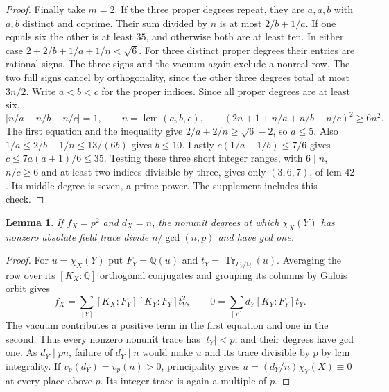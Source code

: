 \documentclass[11pt]{amsart}
\numberwithin{equation}{section}
\newtheorem{lemma}[theorem]{Lemma}
\begin{document}
\begin{proof}
Finally take $m=2$. If the three proper degrees repeat, they are
$a,a,b$ with $a,b$ distinct and coprime. Their sum divided by $n$
is at most $2/b+1/a$. If one equals six the other is at least $35$,
and otherwise both are at least ten. In either case
$2+2/b+1/a+1/n<\sqrt6$. For three distinct proper degrees their
entries are rational signs. The three signs and the vacuum again
exclude a nonreal row. The two full signs cancel by orthogonality,
since the other three degrees total at most $3n/2$.
Write $a<b<c$ for the proper indices. Since all proper degrees are
at least six,
\[
 |n/a-n/b-n/c|=1,\qquad
 n=\operatorname{lcm}(a,b,c),\qquad
 (2n+1+n/a+n/b+n/c)^2\ge6n^2.
\]
The first equation and the inequality give $2/a+2/n\ge\sqrt6-2$,
so $a\le5$. Also $1/a\le2/b+1/n\le13/(6b)$ gives $b\le10$.
Lastly $c(1/a-1/b)\le7/6$ gives
$c\le 7a(a+1)/6\le35$. Testing these three short integer ranges,
with $6\mid n$, $n/c\ge6$ and at least two indices divisible by
three, gives only $(3,6,7)$, of lcm $42$. Its middle degree is
seven, a prime power. The supplement includes this check.
\end{proof}

\begin{lemma}\label{prime-square}
If $f_X=p^2$ and $d_X=n$, the nonunit degrees at which
$\chi_X(Y)$ has nonzero absolute field trace divide $n/\gcd(n,p)$
and have gcd one.
\end{lemma}
\begin{proof}
For $u=\chi_X(Y)$ put $F_Y=\mathbb Q(u)$ and
$t_Y=\operatorname{Tr}_{F_Y/\mathbb Q}(u)$. Averaging the row over its
$[K_X:\mathbb Q]$ orthogonal conjugates and grouping its columns by
Galois orbit gives
\[
 f_X=\sum_{[Y]}[K_X:F_Y][K_Y:F_Y]t_Y^2,\qquad
 0=\sum_{[Y]}d_Y[K_Y:F_Y]t_Y .
\]
The vacuum contributes a positive term in the first equation and one
in the second. Thus every nonzero nonunit trace has $|t_Y|<p$,
and their degrees have gcd one. As $d_Y\mid pn$, failure of
$d_Y\mid n$ would make $u$ and its trace divisible by $p$ by
lcm integrality. If $v_p(d_Y)=v_p(n)>0$, principality gives
$u=(d_Y/n)\chi_Y(X)\equiv0$ at every place above $p$. Its
integer trace is again a multiple of $p$.
\end{proof}
\end{document}
